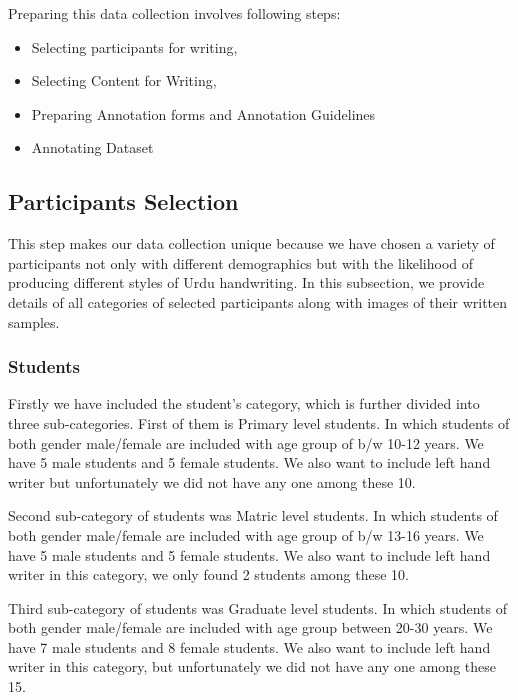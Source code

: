 Preparing this data collection involves following steps:
\begin{itemize}
\item Selecting participants for writing,
\item Selecting Content for Writing,
\item Preparing Annotation forms and Annotation Guidelines
\item Annotating Dataset

\end{itemize}

\subsection{Participants Selection}

This step makes our data collection unique because we have chosen a variety of participants not only with different demographics but with the likelihood of producing different styles of Urdu handwriting. In this subsection, we provide details of all categories of selected participants along with images of their written samples. 
\subsubsection{Students}
Firstly we have included the student’s category, which is further divided into three sub-categories.
First of them is Primary level students. In which students of both gender male/female are included with age group of b/w 10-12 years. We have 5 male students and 5 female students. We also want to include left hand writer but unfortunately we did not have any one among these 10.


Second sub-category of students was Matric level students. In which students of both gender male/female are included with age group of b/w 13-16 years. We have 5 male students and 5 female students. We also want to include left hand writer in this category, we only found 2 students among these 10.

Third sub-category of students was Graduate level students. In which students of both gender male/female are included with age group between 20-30 years. We have 7 male students and 8 female students. We also want to include left hand writer in this category, but unfortunately we did not have any one among these 15.

